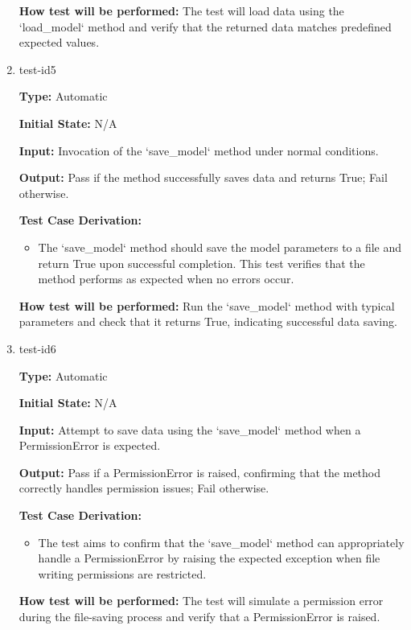 \documentclass[12pt, titlepage]{article}
\begin{document}
\begin{enumerate}
  \textbf{How test will be performed:} 
  The test will load data using the `load\_model` method and verify that the 
  returned data matches predefined expected values.
  
  \item{test-id5\\}
  
  \textbf{Type:} Automatic
  
  \textbf{Initial State:} N/A
  
  \textbf{Input:} Invocation of the `save\_model` method under normal conditions.
  
  \textbf{Output:} Pass if the method successfully saves data and returns True; Fail otherwise.
  
  \textbf{Test Case Derivation:}
  \begin{itemize}
    \item The `save\_model` method should save the model parameters to a file and 
    return True upon successful completion. This test verifies that the method 
    performs as expected when no errors occur.
  \end{itemize}
  
  \textbf{How test will be performed:} 
  Run the `save\_model` method with typical parameters and check that it returns 
  True, indicating successful data saving.
  
  \item{test-id6\\}
  
  \textbf{Type:} Automatic
  
  \textbf{Initial State:} N/A
  
  \textbf{Input:} Attempt to save data using the `save\_model` method 
  when a PermissionError is expected.
  
  \textbf{Output:} Pass if a PermissionError is raised, confirming that the 
  method correctly handles permission issues; Fail otherwise.
  
  \textbf{Test Case Derivation:}
  \begin{itemize}
    \item The test aims to confirm that the `save\_model` method can 
    appropriately handle a PermissionError by raising the expected 
    exception when file writing permissions are restricted.
  \end{itemize}
  
  \textbf{How test will be performed:} 
  The test will simulate a permission error during the file-saving 
  process and verify that a PermissionError is raised.
  

\end{enumerate}
\end{document}
